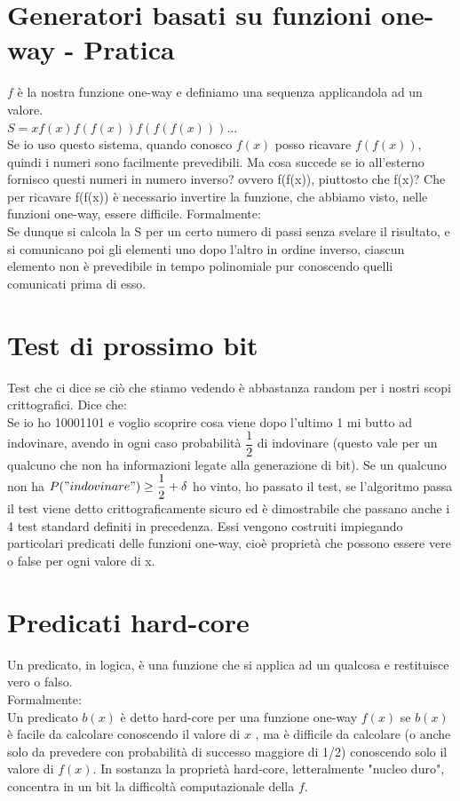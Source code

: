 \section{Generatori basati su funzioni one-way - Pratica}
$f$ è la nostra funzione one-way e definiamo una sequenza applicandola ad un valore.\\
$S = xf(x)f(f(x))f(f(f(x)))...$\\
Se io uso questo sistema, quando conosco $f(x)$ posso ricavare $f(f(x))$, quindi i numeri sono facilmente prevedibili. Ma cosa succede se io all'esterno fornisco questi numeri in numero inverso? ovvero f(f(x)), piuttosto che f(x)? Che per ricavare f(f(x)) è necessario invertire la funzione, che abbiamo visto, nelle funzioni one-way, essere difficile. Formalmente:\\
Se dunque si calcola la S per un certo numero di passi senza svelare il risultato, e si comunicano poi gli elementi uno dopo l’altro in ordine inverso, ciascun elemento non è prevedibile in tempo polinomiale pur conoscendo quelli comunicati prima di esso.

\newpage

\section{Test di prossimo bit}

Test che ci dice se ciò che stiamo vedendo è abbastanza random per i nostri scopi crittografici. Dice che:\\
Se io ho 10001101 e voglio scoprire cosa viene dopo l'ultimo 1 mi butto ad indovinare, avendo in ogni caso probabilità $\dfrac{1}{2}$ di indovinare (questo vale per un qualcuno che non ha informazioni legate alla generazione di bit). Se un qualcuno non ha $P("indovinare") \geq \dfrac{1}{2} + \delta$ ho vinto, ho passato il test, se l'algoritmo passa il test viene detto crittograficamente sicuro ed è dimostrabile che passano anche i 4 test standard definiti in precedenza. Essi
vengono costruiti impiegando particolari predicati delle funzioni one-way, cioè proprietà che possono essere vere o false per ogni valore di x.

\section{Predicati hard-core}
Un predicato, in logica, è una funzione che si applica ad un qualcosa e restituisce vero o falso.\\
Formalmente:\\
Un predicato $b(x)$ è detto hard-core per una funzione one-way $f(x)$ se $b(x)$ è facile da calcolare conoscendo il valore di $x$ , ma è difficile da calcolare (o anche solo da prevedere con probabilità di successo maggiore di 1/2) conoscendo solo il valore di $f (x)$. In sostanza la proprietà hard-core, letteralmente "nucleo duro", concentra in un bit la difficoltà computazionale della $f$. 

